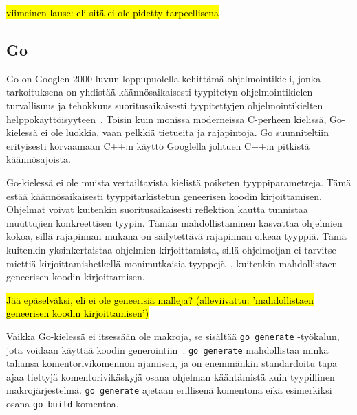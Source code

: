 \hl{viimeinen lause: eli sitä ei ole pidetty tarpeellisena}

\subsection{Go}

Go on Googlen 2000-luvun loppupuolella kehittämä ohjelmointikieli, jonka
tarkoituksena on yhdistää käännösaikaisesti tyypitetyn ohjelmointikielen
turvallisuus ja tehokkuus suoritusaikaisesti tyypitettyjen ohjelmointikielten
helppokäyttöisyyteen~\citep{gohistory}. Toisin kuin monissa moderneissa
C-perheen kielissä, Go-kielessä ei ole luokkia, vaan pelkkiä tietueita ja
rajapintoja. Go suunniteltiin erityisesti korvaamaan C++:n käyttö Googlella
johtuen C++:n pitkistä käännösajoista.

Go-kielessä ei ole muista vertailtavista kielistä poiketen tyyppiparametreja.
Tämä estää käännösaikaisesti tyyppitarkistetun geneerisen koodin
kirjoittamisen. Ohjelmat voivat kuitenkin suoritusaikaisesti reflektion kautta
tunnistaa muuttujien konkreettisen tyypin. Tämän mahdollistaminen kasvattaa
ohjelmien kokoa, sillä rajapinnan mukana on säilytettävä rajapinnan oikeaa
tyyppiä. Tämä kuitenkin yksinkertaistaa ohjelmien kirjoittamista, sillä
ohjelmoijan ei tarvitse miettiä kirjoittamishetkellä monimutkaisia
tyyppejä~\citep[esim.][kalvo 8]{gohistory}, kuitenkin mahdollistaen geneerisen
koodin kirjoittamisen.

\hl{Jää epäselväksi, eli ei ole geneerisiä malleja? (alleviivattu:
'mahdollistaen geneerisen koodin kirjoittamisen')}

Vaikka Go-kielessä ei itsessään ole makroja, se sisältää \texttt{go~generate}
-työkalun, jota voidaan käyttää koodin generointiin~\citep{gogenerate}.
\texttt{go~generate} mahdollistaa minkä tahansa komentorivikomennon ajamisen,
ja on enemmänkin standardoitu tapa ajaa tiettyjä komentorivikäskyjä osana
ohjelman kääntämistä kuin tyypillinen makrojärjestelmä.
\texttt{\mbox{go~generate}} ajetaan erillisenä komentona eikä esimerkiksi osana
\texttt{\mbox{go~build}}-komentoa.



